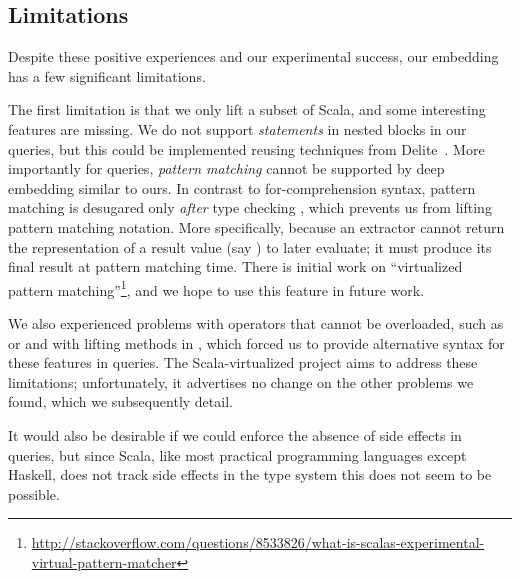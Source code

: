 \subsection{Limitations}
\label{sec:limitations}
Despite these positive experiences and our experimental success, our embedding has a few significant limitations.

The first limitation is that we only lift a subset of Scala, and some interesting features are missing.
We do not support \emph{statements} in nested blocks in our queries, but this could be implemented reusing techniques from Delite~\citep{Rompf11BBlocks}.
More importantly for queries, \emph{pattern matching} cannot be supported by deep embedding similar to ours. In contrast to for-comprehension syntax, pattern matching is desugared only \emph{after} type checking \cite{Emir07Patterns}, which prevents us from lifting pattern matching notation. More specifically, because an extractor \cite{Emir07Patterns} cannot return the representation of a result value (say ) to later evaluate; it must produce its final result at pattern matching time. There is initial work on ``virtualized pattern matching''\footnote{\url{http://stackoverflow.com/questions/8533826/what-is-scalas-experimental-virtual-pattern-matcher}}, and we hope to use this feature in future work.

We also experienced problems with operators that cannot be overloaded, such as \code{==} or  and with lifting methods in , which forced us to provide alternative syntax for these features in queries. The  Scala-virtualized project \citep{Moors12Virtualized} aims to address these limitations; unfortunately, it advertises no change on the other problems we found, which we subsequently detail.


It would also be desirable if we could enforce the absence of side effects in queries, but since Scala, like most practical programming languages except Haskell, does not track side effects in the type system this does not seem to be possible.

